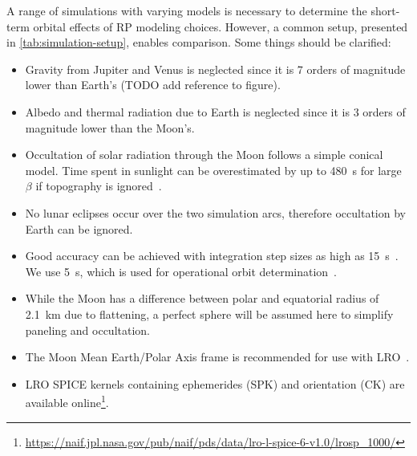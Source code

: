 A range of simulations with varying models is necessary to determine the short-term orbital effects of \gls{RP} modeling choices. However, a common setup, presented in \cref{tab:simulation-setup}, enables comparison. Some things should be clarified:
\begin{itemize}
    \item Gravity from Jupiter and Venus is neglected since it is 7 orders of magnitude lower than Earth's (TODO add reference to figure).
    \item Albedo and thermal radiation due to Earth is neglected since it is 3 orders of magnitude lower than the Moon's.
    \item Occultation of solar radiation through the Moon follows a simple conical model. Time spent in sunlight can be overestimated by up to \qty{480}{\s} for large $\beta$ if topography is ignored~\cite{Mazarico2018}.
    \item No lunar eclipses occur over the two simulation arcs, therefore occultation by Earth can be ignored.
    \item Good accuracy can be achieved with integration step sizes as high as \qty{15}{\s}~\cite{Mazarico2018}. We use \qty{5}{\s}, which is used for operational orbit determination~\cite{Nicholson2010}.
    \item While the Moon has a difference between polar and equatorial radius of \qty{2.1}{\km} due to flattening, a perfect sphere will be assumed here to simplify paneling and occultation.
    \item The Moon Mean Earth/Polar Axis frame is recommended for use with \gls{LRO}~\cite{GSFC2008}.
    \item \gls{LRO} SPICE kernels containing ephemerides (SPK) and orientation (CK) are available online\footnote{\url{https://naif.jpl.nasa.gov/pub/naif/pds/data/lro-l-spice-6-v1.0/lrosp_1000/}}.
\end{itemize}
